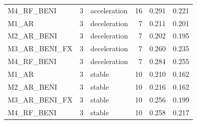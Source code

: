 \begin{tabular}{lrlrrr}
M4\_RF\_BENI & 3 & acceleration & 16 & 0.291 & 0.221 \\
M1\_AR & 3 & deceleration & 7 & 0.211 & 0.201 \\
M2\_AR\_BENI & 3 & deceleration & 7 & 0.202 & 0.195 \\
M3\_AR\_BENI\_FX & 3 & deceleration & 7 & 0.260 & 0.235 \\
M4\_RF\_BENI & 3 & deceleration & 7 & 0.284 & 0.255 \\
M1\_AR & 3 & stable & 10 & 0.210 & 0.162 \\
M2\_AR\_BENI & 3 & stable & 10 & 0.216 & 0.162 \\
M3\_AR\_BENI\_FX & 3 & stable & 10 & 0.256 & 0.199 \\
M4\_RF\_BENI & 3 & stable & 10 & 0.258 & 0.217 \\
\bottomrule
\end{tabular}
